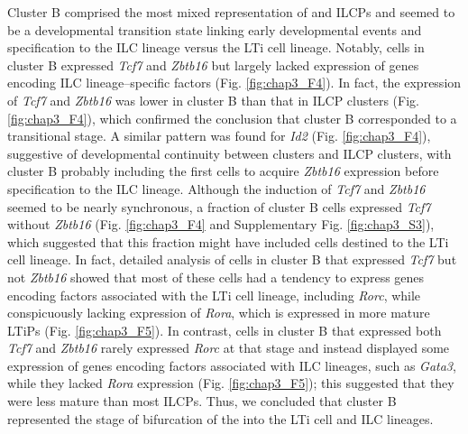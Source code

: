 Cluster B comprised the most mixed representation of \aLPs and ILCPs and seemed to be a developmental transition state linking early developmental events and specification to the ILC lineage versus the LTi cell lineage. Notably, cells in cluster B expressed \textit{Tcf7} and \textit{Zbtb16} but largely lacked expression of genes encoding ILC lineage–specific factors (Fig. \ref{fig:chap3_F4}). In fact, the expression of \textit{Tcf7} and \textit{Zbtb16} was lower in cluster B than that in ILCP clusters (Fig. \ref{fig:chap3_F4}), which confirmed the conclusion that cluster B corresponded to a transitional stage. A similar pattern was found for \textit{Id2} (Fig. \ref{fig:chap3_F4}), suggestive of developmental continuity between \aLP clusters and ILCP clusters, with cluster B probably including the first cells to acquire \textit{Zbtb16} expression before specification to the ILC lineage. Although the induction of \textit{Tcf7} and \textit{Zbtb16} seemed to be nearly synchronous, a fraction of cluster B cells expressed \textit{Tcf7} without \textit{Zbtb16} (Fig. \ref{fig:chap3_F4} and Supplementary Fig. \ref{fig:chap3_S3}), which suggested that this fraction might have included cells destined to the LTi cell lineage. In fact, detailed analysis of cells in cluster B that expressed \textit{Tcf7} but not \textit{Zbtb16} showed that most of these cells had a tendency to express genes encoding factors associated with the LTi cell lineage, including \textit{Rorc}, while conspicuously lacking expression of \textit{Rora}, which is expressed in more mature LTiPs (Fig. \ref{fig:chap3_F5}). In contrast, cells in cluster B that expressed both \textit{Tcf7} and \textit{Zbtb16} rarely expressed \textit{Rorc} at that stage and instead displayed some expression of genes encoding factors associated with ILC lineages, such as \textit{Gata3}, while they lacked \textit{Rora} expression (Fig. \ref{fig:chap3_F5}); this suggested that they were less mature than most ILCPs. Thus, we concluded that cluster B represented the stage of bifurcation of the \aLP into the LTi cell and ILC lineages.

